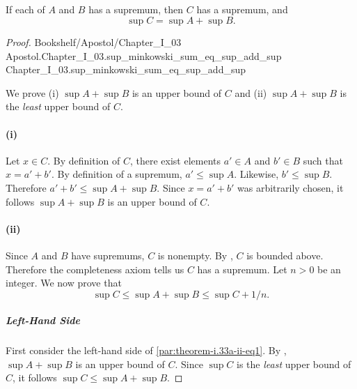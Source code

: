 \documentclass{article}
\newcommand{\link}[1]{\lean{../..}
  {Bookshelf/Apostol/Chapter\_I\_03} %
  {Apostol.Chapter\_I\_03.#1} %
  {Chapter\_I\_03.#1} %
}
\begin{document}
\subsection*{}%
%

If each of $A$ and $B$ has a supremum, then $C$ has a supremum, and
  $$\sup{C} = \sup{A} + \sup{B}.$$

\begin{proof}

  \link{sup\_minkowski\_sum\_eq\_sup\_add\_sup}

  \divider

  We prove (i) $\sup{A} + \sup{B}$ is an upper bound of $C$ and (ii)
    $\sup{A} + \sup{B}$ is the \textit{least} upper bound of $C$.

  \paragraph{(i)}%

    Let $x \in C$.
    By definition of $C$, there exist elements $a' \in A$ and $b' \in B$ such
      that $x = a' + b'$.
    By definition of a supremum, $a' \leq \sup{A}$.
    Likewise, $b' \leq \sup{B}$.
    Therefore $a' + b' \leq \sup{A} + \sup{B}$.
    Since $x = a' + b'$ was arbitrarily chosen, it follows $\sup{A} + \sup{B}$
      is an upper bound of $C$.

  \paragraph{(ii)}%

    Since $A$ and $B$ have supremums, $C$ is nonempty.
    By , $C$ is bounded above.
    Therefore the completeness axiom tells us $C$ has a supremum.
    Let $n > 0$ be an integer.
    We now prove that
      \begin{equation}
        \label{par:theorem-i.33a-ii-eq1}
        \sup{C} \leq \sup{A} + \sup{B} \leq \sup{C} + 1 / n.
      \end{equation}

    \subparagraph{Left-Hand Side}%

      First consider the left-hand side of \eqref{par:theorem-i.33a-ii-eq1}.
      By , $\sup{A} + \sup{B}$ is an upper bound of
        $C$.
      Since $\sup{C}$ is the \textit{least} upper bound of $C$, it follows
        $\sup{C} \leq \sup{A} + \sup{B}$.


\end{proof}
\end{document}
